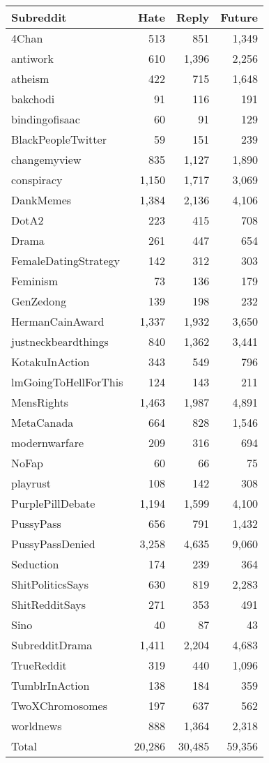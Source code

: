 \documentclass[11pt]{article}
\begin{document}
	
	
	
	\appendix
	
	\begin{table}[ht!]
		\centering
		\small
		\begin{tabular}{lrrr}
			\toprule
			Subreddit & Hate  & Reply & Future\\
			\midrule
			4Chan	 & 513 &	851	&1,349\\
			antiwork &	610	&1,396	&2,256\\	
			atheism	&422	&715	&1,648
			\\
			bakchodi	&91	&116	&191
			\\
			bindingofisaac	&60	&91	&129
			\\
			BlackPeopleTwitter	&59	&151	&239
			\\
			changemyview	&835	&1,127&	1,890
			\\
			conspiracy&	1,150&	1,717&	3,069
			\\
			DankMemes&	1,384&	2,136&	4,106
			\\
			DotA2&	223&	415&	708
			\\
			Drama&	261	&447	&654
			\\
			FemaleDatingStrategy&	142	&312&	303
			\\
			Feminism&	73&	136	&179
			\\
			GenZedong&	139&	198	&232
			\\
			HermanCainAward&	1,337&	1,932&	3,650
			\\
			justneckbeardthings&	840&	1,362&	3,441
			\\
			KotakuInAction&	343	&549	&796
			\\
			lmGoingToHellForThis&	124	&143&	211
			\\
			MensRights&	1,463&	1,987&	4,891
			\\
			MetaCanada	&664&	828	&1,546
			\\
			modernwarfare&	209	&316	&694
			\\
			NoFap&	60	&66&	75
			\\
			playrust	&108&	142	&308
			\\
			PurplePillDebate&	1,194&	1,599&	4,100
			\\
			PussyPass&	656&	791&	1,432
			\\
			PussyPassDenied	&3,258&	4,635&	9,060
			\\
			Seduction&	174	&239&	364
			\\
			ShitPoliticsSays&	630	&819	&2,283
			\\
			ShitRedditSays	&271&	353&	491
			\\
			Sino&	40&	87&	43
			\\
			SubredditDrama&	1,411&	2,204&	4,683
			\\
			TrueReddit	&319	&440&	1,096
			\\
			TumblrInAction&	138&	184&	359
			\\
			TwoXChromosomes	&197	&637&	562
			\\
			worldnews	&888&	1,364&	2,318\\
			\midrule
			Total & 20,286 & 30,485 & 59,356 \\
			\bottomrule
			

\end{tabular}
\end{table}
\end{document}
